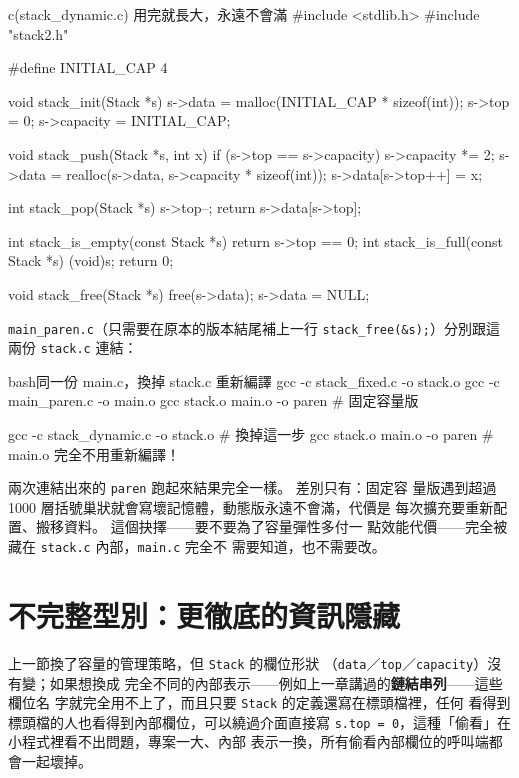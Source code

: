\begin{example}{c}{(stack\_dynamic.c) 用完就長大，永遠不會滿}
#include <stdlib.h>
#include "stack2.h"

#define INITIAL_CAP 4

void stack_init(Stack *s) {
    s->data = malloc(INITIAL_CAP * sizeof(int));
    s->top = 0;
    s->capacity = INITIAL_CAP;
}

void stack_push(Stack *s, int x) {
    if (s->top == s->capacity) {
        s->capacity *= 2;
        s->data = realloc(s->data, s->capacity * sizeof(int));
    }
    s->data[s->top++] = x;
}

int stack_pop(Stack *s) {
    s->top--;
    return s->data[s->top];
}

int stack_is_empty(const Stack *s) { return s->top == 0; }
int stack_is_full(const Stack *s)  { (void)s; return 0; }

void stack_free(Stack *s) {
    free(s->data);
    s->data = NULL;
}
\end{example}

\texttt{main\_paren.c}（只需要在原本的版本結尾補上一行
\texttt{stack\_free(\&s);}）分別跟這兩份 \texttt{stack.c} 連結：

\begin{code}{bash}{同一份 main.c，換掉 stack.c 重新編譯}
gcc -c stack_fixed.c -o stack.o
gcc -c main_paren.c -o main.o
gcc stack.o main.o -o paren   # 固定容量版

gcc -c stack_dynamic.c -o stack.o   # 換掉這一步
gcc stack.o main.o -o paren         # main.o 完全不用重新編譯！
\end{code}

兩次連結出來的 \texttt{paren} 跑起來結果完全一樣。 差別只有：固定容
量版遇到超過 1000 層括號巢狀就會寫壞記憶體，動態版永遠不會滿，代價是
每次擴充要重新配置、搬移資料。 這個抉擇——要不要為了容量彈性多付一
點效能代價——完全被藏在 \texttt{stack.c} 內部，\texttt{main.c} 完全不
需要知道，也不需要改。


\section{不完整型別：更徹底的資訊隱藏}
\label{sec:obj-opaque}

上一節換了容量的管理策略，但 \texttt{Stack} 的欄位形狀
（\texttt{data}／\texttt{top}／\texttt{capacity}）沒有變；如果想換成
完全不同的內部表示——例如上一章講過的\textbf{鏈結串列}——這些欄位名
字就完全用不上了，而且只要 \texttt{Stack} 的定義還寫在標頭檔裡，任何
看得到標頭檔的人也看得到內部欄位，可以繞過介面直接寫
\texttt{s.top = 0}，這種「偷看」在小程式裡看不出問題，專案一大、內部
表示一換，所有偷看內部欄位的呼叫端都會一起壞掉。

